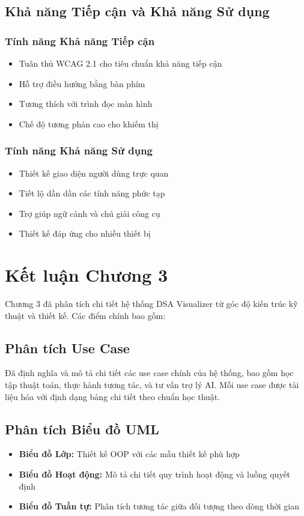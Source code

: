 \subsection{Khả năng Tiếp cận và Khả năng Sử dụng}

\subsubsection{Tính năng Khả năng Tiếp cận}
\begin{itemize}
    \item Tuân thủ WCAG 2.1 cho tiêu chuẩn khả năng tiếp cận
    \item Hỗ trợ điều hướng bằng bàn phím
    \item Tương thích với trình đọc màn hình
    \item Chế độ tương phản cao cho khiếm thị
\end{itemize}

\subsubsection{Tính năng Khả năng Sử dụng}
\begin{itemize}
    \item Thiết kế giao diện người dùng trực quan
    \item Tiết lộ dần dần các tính năng phức tạp
    \item Trợ giúp ngữ cảnh và chú giải công cụ
    \item Thiết kế đáp ứng cho nhiều thiết bị
\end{itemize}

\section{Kết luận Chương 3}
\label{sec:chapter3-conclusion}

Chương 3 đã phân tích chi tiết hệ thống DSA Visualizer từ góc độ kiến trúc kỹ thuật và thiết kế. Các điểm chính bao gồm:

\subsection{Phân tích Use Case}
Đã định nghĩa và mô tả chi tiết các use case chính của hệ thống, bao gồm học tập thuật toán, thực hành tương tác, và tư vấn trợ lý AI. Mỗi use case được tài liệu hóa với định dạng bảng chi tiết theo chuẩn học thuật.

\subsection{Phân tích Biểu đồ UML}
\begin{itemize}
    \item \textbf{Biểu đồ Lớp:} Thiết kế OOP với các mẫu thiết kế phù hợp
    \item \textbf{Biểu đồ Hoạt động:} Mô tả chi tiết quy trình hoạt động và luồng quyết định
    \item \textbf{Biểu đồ Tuần tự:} Phân tích tương tác giữa đối tượng theo dòng thời gian
\end{itemize}

